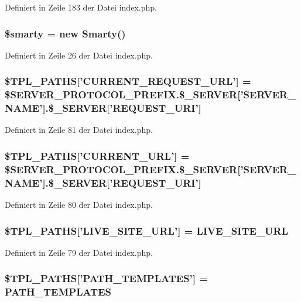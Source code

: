 Definiert in Zeile 183 der Datei index.php.
\subsubsection{\setlength{\rightskip}{0pt plus 5cm}\$smarty = new Smarty()}\label{index_8php_c3ae29e9ccbb2006fa26fd9eb2c12117}




Definiert in Zeile 26 der Datei index.php.
\subsubsection{\setlength{\rightskip}{0pt plus 5cm}\$TPL\_\-PATHS['CURRENT\_\-REQUEST\_\-URL'] = \$SERVER\_\-PROTOCOL\_\-PREFIX.\$\_\-SERVER['SERVER\_\-NAME'].\$\_\-SERVER['REQUEST\_\-URI']}\label{index_8php_c739e919945532e02167b94c6f3f9c28}




Definiert in Zeile 81 der Datei index.php.
\subsubsection{\setlength{\rightskip}{0pt plus 5cm}\$TPL\_\-PATHS['CURRENT\_\-URL'] = \$SERVER\_\-PROTOCOL\_\-PREFIX.\$\_\-SERVER['SERVER\_\-NAME'].\$\_\-SERVER['REQUEST\_\-URI']}\label{index_8php_cfea45497a1e0f293b44cb4b4b7dcb37}




Definiert in Zeile 80 der Datei index.php.
\subsubsection{\setlength{\rightskip}{0pt plus 5cm}\$TPL\_\-PATHS['{\bf LIVE\_\-SITE\_\-URL}'] = {\bf LIVE\_\-SITE\_\-URL}}\label{index_8php_75097ca8a7b2079eb8f4291cc053b615}




Definiert in Zeile 79 der Datei index.php.
\subsubsection{\setlength{\rightskip}{0pt plus 5cm}\$TPL\_\-PATHS['{\bf PATH\_\-TEMPLATES}'] = {\bf PATH\_\-TEMPLATES}}\label{index_8php_4fb56e5f96edb8b2c243e95d32f8ba93}




